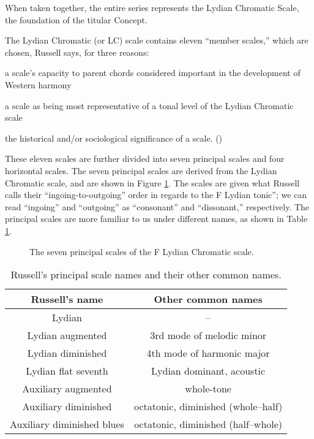\noindent When taken together, the entire series represents the Lydian
Chromatic Scale, the foundation of the titular Concept.

The Lydian Chromatic (or LC) scale contains eleven ``member scales,'' which are
chosen, Russell says, for three reasons:%
%
\begin{compactenum}[\qquad a.\ ]
    \singlespacing
    \item a scale's capacity to parent chords considered important in the
      development of Western harmony
    \item a scale as being most representative of a tonal level of the Lydian
      Chromatic scale
    \item the historical and/or sociological significance of a
      scale. ()
\end{compactenum}
%
These eleven scales are further divided into seven principal scales and four
horizontal scales. The seven principal scales are derived from the Lydian
Chromatic scale, and are shown in Figure \ref{lcc:principal-scales}. The
scales are given what Russell calls their ``ingoing-to-outgoing'' order in
regards to the F Lydian tonic''; we can read ``ingoing'' and ``outgoing'' as
``consonant'' and ``dissonant,'' respectively.
The principal scales are more familiar to us under different names, as shown in
Table \ref{lcc:scale-names}.

\begin{figure}[p]
  \caption{The seven principal scales of the F Lydian Chromatic scale.}
  \label{lcc:principal-scales}
\end{figure}

\begin{table}[p]
  \setlength{\tabcolsep}{12pt}
  \centering
  \begin{tabular}{cc}
   Russell's name  & Other common names \\
   \hline
   \rule[1em]{0ex}{1ex}%
   Lydian & -- \\
   Lydian augmented & 3rd mode of melodic minor \\
   Lydian diminished & 4th mode of harmonic major \\
   Lydian flat seventh & Lydian dominant, acoustic \\
   Auxiliary augmented & whole-tone \\
   Auxiliary diminished & octatonic, diminished (whole--half) \\
   Auxiliary diminished blues & octatonic, diminished (half--whole)
  \end{tabular}
  \caption{Russell's principal scale names and their other common names.}
  \label{lcc:scale-names}
\end{table}

